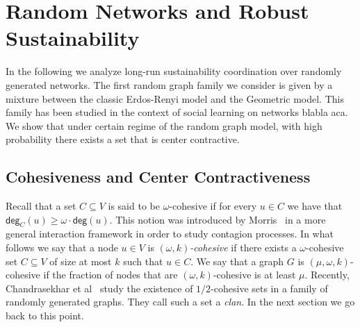 \documentclass[letterpaper,11pt]{article}
\newcommand{\degsf}{\mathsf{deg}}
\begin{document}
\section{Random Networks and Robust Sustainability}
\label{sec:random}

In the following we analyze long-run sustainability coordination over randomly generated networks.
The first random graph family we consider is given by a mixture between the classic Erdos-Renyi model and the Geometric model. 
This family has been studied in the context of social learning on networks {\color{red} blabla aca}.
We show that under certain regime of the random graph model, with high probability there exists a set that is center contractive.

\subsection{Cohesiveness and Center Contractiveness}

Recall that a set $C\subseteq V$ is said to be $\omega$-cohesive if for every $u\in C$ we have that $\degsf_C(u)\ge \omega\cdot \degsf(u)$.
This notion was introduced by Morris~\cite{morris} in a more general interaction framework in order to study contagion processes.
In what follows we say that a node $u\in V$ is {\it $(\omega,k)$-cohesive} if there exists a $\omega$-cohesive set $C\subseteq V$ of size at most $k$ such that $u\in C$.
We say that a graph $G$ is $(\mu,\omega,k)$-cohesive if the fraction of nodes that are $(\omega,k)$-cohesive is at least $\mu$.
Recently, Chandrasekhar et al~\cite{} study the existence of $1/2$-cohesive sets in a family of randomly generated graphs. 
They call such a set a {\it clan}. 
In the next section we go back to this point.
\end{document}
